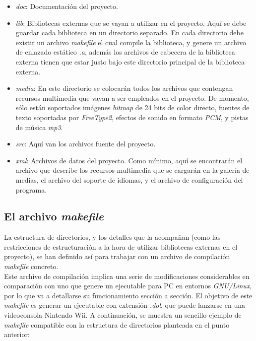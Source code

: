 \begin{itemize}
\item \emph{doc}: Documentación del proyecto.
\item \emph{lib}: Bibliotecas externas que se vayan a utilizar en el proyecto. Aquí se debe guardar cada biblioteca en un directorio separado. En cada directorio debe existir un archivo \emph{makefile} el cual compile la biblioteca, y genere un archivo de enlazado estático \emph{.a}, además los archivos de cabecera de la biblioteca externa tienen que estar justo bajo este directorio principal de la biblioteca externa.
\item \emph{media}: En este directorio se colocarán todos los archivos que contengan recursos multimedia que vayan a ser empleados en el proyecto. De momento, sólo están soportados imágenes \emph{bitmap} de 24 bits de color directo, fuentes de texto soportadas por \emph{FreeType2}, efectos de sonido en formato \emph{PCM}, y pistas de música \emph{mp3}.
\item \emph{src}: Aquí van los archivos fuente del proyecto.
\item \emph{xml}: Archivos de datos del proyecto. Como mínimo, aquí se encontrarán el archivo que describe los recursos multimedia que se cargarán en la galería de medias, el archivo del soporte de idiomas, y el archivo de configuración del programa.
\end{itemize}

\subsection{El archivo \emph{makefile}}

La estructura de directorios, y los detalles que la acompañan (como las restricciones de estructuración a la hora de utilizar bibliotecas externas en el proyecto), se han definido así para trabajar con un archivo de compilación \emph{makefile} concreto. \\

Este archivo de compilación implica una serie de modificaciones considerables en comparación con uno que genere un ejecutable para PC en entornos \emph{GNU/Linux}, por lo que va a detallarse su funcionamiento sección a sección. El objetivo de este \emph{makefile} es generar un ejecutable con extensión \emph{.dol}, que puede lanzarse en una videoconsola Nintendo Wii. A continuación, se muestra un sencillo ejemplo de \emph{makefile} compatible con la estructura de directorios planteada en el punto anterior:

